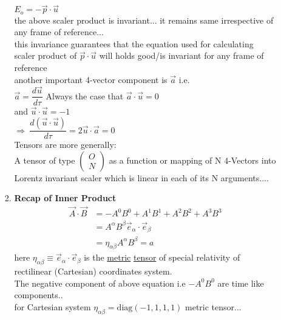 \documentclass[11pt,a4paper]{article}
\begin{document}
\begin{enumerate}
\begin{enumerate}
\begin{enumerate}
			                  $\boxed{E_o = - \vec{p}\cdot\vec{u}}$\\
			                  the above scaler product is invariant... it remains same irrespective of any frame of reference...\\
			                  this invariance guarantees that the equation used for calculating scaler product of $\vec{p}\cdot\vec{u}$ will holds good/is invariant for any frame of reference \\
			                  another important 4-vector component is $\vec{a}$ i.e.\\
			                  $\vec{a}=\dfrac{d\vec{u}}{d\tau}$
			                  Always the case that $\vec{a}\cdot\vec{u}=0$\\ and
			                  $\vec{u}\cdot\vec{u}=-1$\\
			                  $\Rightarrow\ \dfrac{d(\vec{u}\cdot\vec{u})}{d\tau}=2\vec{u}\cdot\vec{a}=0$\\
			                  Tensors are more generally:\\
			                  A tensor of type $\begin{pmatrix}
					                  O \\
					                  N
				                  \end{pmatrix}$ as a function or mapping of N 4-Vectors into Lorentz invariant scaler which is linear in each of its N arguments....
			            \item \textbf{Recap of Inner Product}
			                  \begin{align*}
				                  \vec{A}\cdot\vec{B} & =-A^0B^0+A^1B^1+A^2B^2+A^3B^3                        \\
				                                      & =A^\alpha B^\beta \vec{e}_\alpha \cdot \vec{e}_\beta \\
				                                      & =\eta_{\alpha\beta} A^\alpha B^\beta=a
			                  \end{align*}
			                  here $\eta_{\alpha\beta}\equiv\vec{e}_\alpha \cdot \vec{e}_\beta$ is the \underline{metric} \underline{tensor} of special relativity of rectilinear (Cartesian) coordinates system.\\
			                  The negative component of above equation i.e $-A^0B^0$ are time like components..\\
			                  for Cartesian system $\eta_{\alpha\beta}=\text{diag}(-1,1,1,1)$ metric tensor...\\

\end{enumerate}
\end{enumerate}
\end{enumerate}
\end{document}
